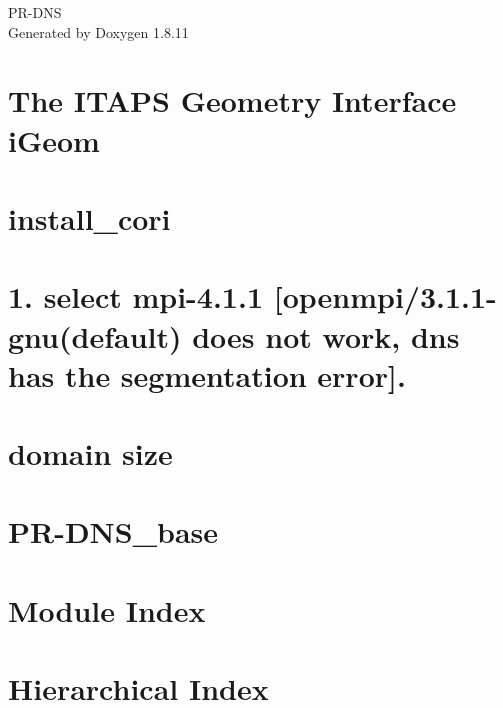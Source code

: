 \documentclass[twoside]{book}
\newcommand{\+}{\discretionary{\mbox{\scriptsize$\hookleftarrow$}}{}{}}
\newcommand{\clearemptydoublepage}{%
  \newpage{\pagestyle{empty}\cleardoublepage}%
}
\begin{document}
\hypersetup{pageanchor=false,
             bookmarksnumbered=true,
             pdfencoding=unicode
            }
\begin{titlepage}
\vspace*{7cm}
\begin{center}%
{\Large P\+R-\/\+D\+NS }\\
\vspace*{1cm}
{\large Generated by Doxygen 1.8.11}\\
\end{center}
\end{titlepage}
\clearemptydoublepage
\tableofcontents
\clearemptydoublepage
{}
\hypersetup{pageanchor=true}

\chapter{The I\+T\+A\+PS Geometry Interface i\+Geom}
\label{index}\hypertarget{index}{}
\chapter{install\+\_\+cori}
\label{md_install_cori}
\hypertarget{md_install_cori}{}

\chapter{1. select mpi-\/4.1.1 \mbox{[}openmpi/3.1.1-\/gnu(default) does not work, dns has the segmentation error\mbox{]}.}
\label{md_install_IC}
\hypertarget{md_install_IC}{}

\chapter{domain size}
\label{md_parameters}
\hypertarget{md_parameters}{}

\chapter{P\+R-\/\+D\+N\+S\+\_\+base}
\label{md_README}
\hypertarget{md_README}{}

\chapter{Module Index}

\chapter{Hierarchical Index}

\end{document}
